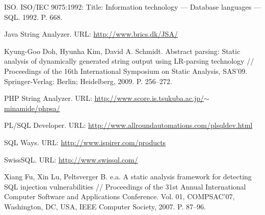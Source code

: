 \documentclass{llncs}
\begin{document}
\begin{thebibliography}{}
ISO. ISO/IEC 9075:1992: Title: Information technology — Database languages — SQL. 1992. P. 668.

Java String Analyzer. URL: \href{http://www.brics.dk/JSA/}{http://www.brics.dk/JSA/}

Kyung-Goo Doh, Hyunha Kim, David A. Schmidt. Abstract parsing: Static analysis of dynamically generated string output using LR-parsing technology // Proceedings of the 16th International Symposium on Static Analysis, SAS’09. Springer-Verlag: Berlin; Heidelberg, 2009. P. 256–272.

PHP String Analyzer. URL: \href{http://www.score.is.tsukuba.ac.jp/~minamide/phpsa/}{http://www.score.is.tsukuba.ac.jp/$\sim$minamide/phpsa/}

PL/SQL Developer. URL: \href{http://www.allroundautomations.com/plsqldev.html}{http://www.allroundautomations.com/plsqldev.html}

SQL Ways. URL: \href{http://www.ispirer.com/products}{http://www.ispirer.com/products}

SwissSQL. URL: \href{http://www.swissql.com/}{http://www.swissql.com/}

Xiang Fu, Xin Lu, Peltsverger B. e.a. A static analysis framework for detecting SQL injection vulnerabilities // Proceedings of the 31st Annual International Computer Software and Applications Conference. Vol. 01, COMPSAC’07, Washington, DC, USA, IEEE Computer Society, 2007. P. 87–96.

\end{thebibliography}


%
\end{document}
